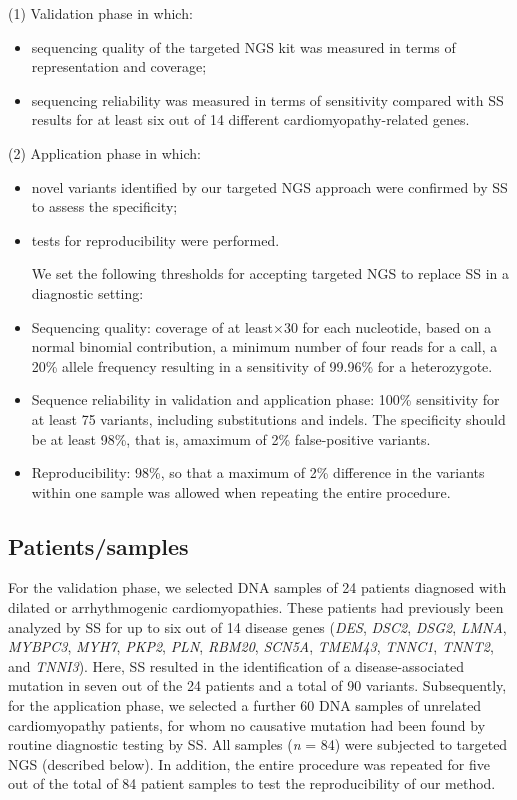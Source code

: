 (1) Validation phase in which:
\begin{itemize}
	\item sequencing quality of the targeted NGS kit was measured in terms of representation and coverage;
	\item sequencing reliability was measured in terms of sensitivity compared with SS results for at least six out of 14 different cardiomyopathy-related genes.
\end{itemize}
(2) Application phase in which:
\begin{itemize}
	\item novel variants identified by our targeted NGS approach were confirmed by SS to assess the specificity;
	\item tests for reproducibility were performed. 
	
	We set the following thresholds for accepting targeted NGS to replace SS in a diagnostic setting:
	\item Sequencing quality: coverage of at least×30 for each nucleotide, based on a normal binomial contribution, a minimum number of four reads for a call, a 20\% allele frequency resulting in a sensitivity of 99.96\% for a heterozygote.
	\item Sequence reliability in validation and application phase: 100\% sensitivity for at least 75 variants, including substitutions and indels. The specificity should be at least 98\%, that is, amaximum of 2\% false-positive variants.
	\item Reproducibility: 98\%, so that a maximum of 2\% difference in the variants within one sample was allowed when repeating the entire procedure. 
\end{itemize}

\subsection{Patients/samples}
For the validation phase, we selected DNA samples of 24 patients diagnosed with dilated or arrhythmogenic cardiomyopathies. 
These patients had previously been analyzed by SS for up to six out of 14 disease genes (\textsl{DES}, \textsl{DSC2}, \textsl{DSG2}, \textsl{LMNA}, \textsl{MYBPC3}, \textsl{MYH7}, \textsl{PKP2}, \textsl{PLN}, \textsl{RBM20}, \textsl{SCN5A}, \textsl{TMEM43}, \textsl{TNNC1}, \textsl{TNNT2}, and \textsl{TNNI3}). 
Here, SS resulted in the identification of a disease-associated mutation in seven out of the 24 patients and a total of 90 variants. 
Subsequently, for the application phase, we selected a further 60 DNA samples of unrelated cardiomyopathy patients, for whom no causative mutation had been found by routine diagnostic testing by SS. 
All samples (\textsl{n} = 84) were subjected to targeted NGS (described below). 
In addition, the entire procedure was repeated for five out of the total of 84 patient samples to test the reproducibility of our method.

